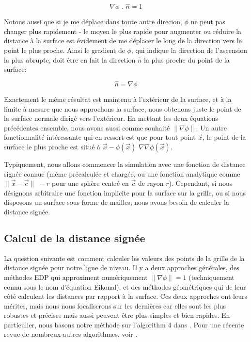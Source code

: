 \documentclass[11pt]{report}
\begin{document}
\begin{equation}
\nabla \phi \,\,.\,\, \hat{n} = 1
\end{equation}

Notons aussi que si je me déplace dans toute autre direcion, $\phi$ ne peut pas changer plus rapidement - le moyen le plus rapide pour augmenter ou réduire la distance  à la surface est évidement de me déplacer le long de la direction vers le point le plus proche. Ainsi le gradient  de $\phi$, qui indique la direction de l'ascension la plus abrupte, doit être en fait la direction  $\hat{n}$ la plus proche du point de la surface:

\begin{equation}
\hat{n} = \nabla \phi
\end{equation}

Exactement le même résultat est maintenu à l'extérieur de la surface, et à la limite à mesure que nous approchons la surface, nous obtenons juste le point de la surface normale dirigé vers l'extérieur. En mettant les deux équations précédentes ensemble, nous avons aussi comme souhaité $\| \nabla \phi \|$. Un autre fonctionnalité intéressante qui en ressort est que pour tout point $\overrightarrow{x}$, le point de la surface le plus proche est situé à $\overrightarrow{x} - \phi (\overrightarrow{x})\,\, \nabla \nabla \phi (\overrightarrow{x})$. \newline

Typiquement, nous allons commencer la simulation avec une fonction de distance signée connue (même précalculée et chargée, ou une fonction analytique comme $\| \overrightarrow{x} - \overrightarrow{c} \| \,\, - r$ pour une sphère centré en $\overrightarrow{c}$ de rayon $r$). Cependant, si nous désignons arbitraire une fonction implicite pour la surface sur la grille, ou si nous disposons un surface sous forme de mailles, nous avons besoin de calculer la distance signée.

\subsection{Calcul de la distance signée}

La question suivante est comment calculer les valeurs des points de la grille de la distance signée pour notre ligne de niveau. Il y a deux approches générales, des méthodes EDP qui approximent numériquement $\| \nabla \phi \| = 1$ (techniquement connu sous le nom d'équation Eikonal), et des méthodes géométriques qui de leur côté calculent les distances par rapport à la surface. Ces deux approches ont leurs mérites, mais nous nous focaliserons sur les dernières car elles sont les plus robustes et précises mais aussi peuvent être plus simples et bien rapides. En particulier, nous basons notre méthode sur l'algorithm 4 dans \cite{tsai-2002}. Pour une récente revue de nombreux autres algorithmes, voir \cite{Jones-Baerentzen-sramek-2006}.\newline
\end{document}
